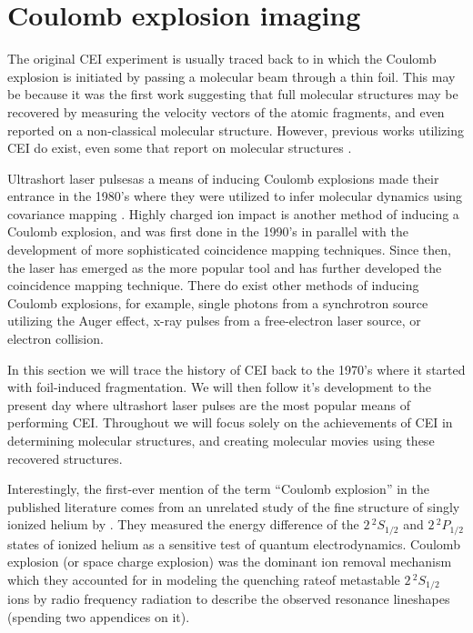 \section{Coulomb explosion imaging}
The original CEI experiment is usually traced back to \citet{Vager89} in which the Coulomb explosion is initiated by passing a molecular beam through a thin foil. This may be because it was the first work suggesting that full molecular structures may be recovered by measuring the velocity vectors of the atomic fragments, and even reported on a non-classical molecular structure. However, previous works utilizing CEI do exist, even some that report on molecular structures \citep{Kanter79}.

Ultrashort laser pulses\footnotemark as a means of inducing Coulomb explosions made their entrance in the 1980's where they were utilized to infer molecular dynamics using covariance mapping \citep{Frasinski89}. Highly charged ion impact is another method of inducing a Coulomb explosion, and was first done in the 1990's in parallel with the development of more sophisticated coincidence mapping techniques. Since then, the laser has emerged as the more popular tool and has further developed the coincidence mapping technique. There do exist other methods of inducing Coulomb explosions, for example, single photons from a synchrotron source utilizing the Auger effect, x-ray pulses from a free-electron laser source, or electron collision.


In this section we will trace the history of CEI back to the 1970's where it started with foil-induced fragmentation. We will then follow it's development to the present day where ultrashort laser pulses are the most popular means of performing CEI. Throughout we will focus solely on the achievements of CEI in determining molecular structures, and creating molecular movies using these recovered structures\footnotemark.


Interestingly, the first-ever mention of the term ``Coulomb explosion'' in the published literature comes from an unrelated study of the fine structure of singly ionized helium by \citet{Novick55}. They measured the energy difference of the $2 \, ^2 S_{1/2}$ and $2 \, ^2 P_{1/2}$ states of ionized helium as a sensitive test of quantum electrodynamics. Coulomb explosion (or space charge explosion) was the dominant ion removal mechanism which they accounted for in modeling the quenching rate\footnotemark of metastable $2 \, ^2 S_{1/2}$ ions by radio frequency radiation to describe the observed resonance lineshapes (spending two appendices on it).

